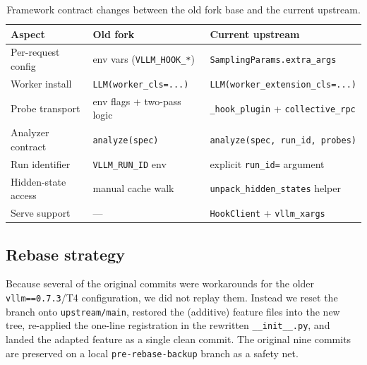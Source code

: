 \documentclass[11pt]{article}
\begin{document}
\begin{table}[h]
\centering
\caption{Framework contract changes between the old fork base and the current upstream.}
\label{tab:apimap}
\begin{tabular}{lll}
\toprule
\textbf{Aspect} & \textbf{Old fork} & \textbf{Current upstream}\\
\midrule
Per-request config   & env vars (\texttt{VLLM\_HOOK\_*}) & \texttt{SamplingParams.extra\_args}\\
Worker install       & \texttt{LLM(worker\_cls=...)}     & \texttt{LLM(worker\_extension\_cls=...)}\\
Probe transport      & env flags + two-pass logic        & \texttt{\_hook\_plugin} + \texttt{collective\_rpc}\\
Analyzer contract    & \texttt{analyze(spec)}            & \texttt{analyze(spec, run\_id, probes)}\\
Run identifier       & \texttt{VLLM\_RUN\_ID} env         & explicit \texttt{run\_id=} argument\\
Hidden-state access  & manual cache walk                 & \texttt{unpack\_hidden\_states} helper\\
Serve support        & ---                                & \texttt{HookClient} + \texttt{vllm\_xargs}\\
\bottomrule
\end{tabular}
\end{table}

\subsection{Rebase strategy}
Because several of the original commits were workarounds for the older
\texttt{vllm==0.7.3}/T4 configuration, we did not replay them. Instead we reset the branch onto
\texttt{upstream/main}, restored the (additive) feature files into the new tree, re-applied
the one-line registration in the rewritten \texttt{\_\_init\_\_.py}, and landed the adapted
feature as a single clean commit. The original nine commits are preserved on a local
\texttt{pre-rebase-backup} branch as a safety net.
\end{document}
